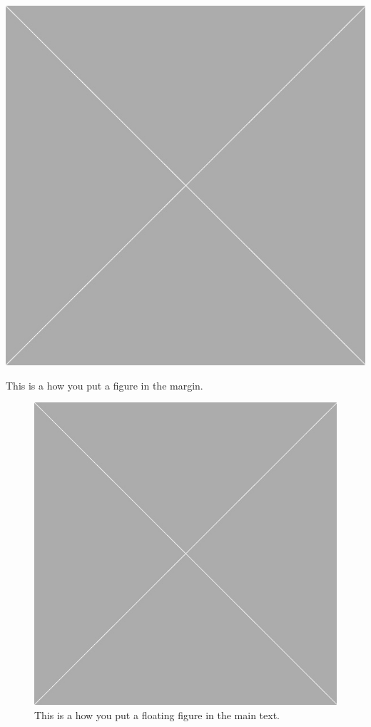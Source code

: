 \documentclass[10pt,oneside]{book}
\begin{document}
\begin{marginfigure}
  \includegraphics[width=\linewidth]{Pictures/placeholder.jpg}
  \caption{This is a how you put a figure in the margin.}
  \label{fig:marginfig}
\end{marginfigure}

\begin{figure}
  \centering
  \includegraphics[width=\linewidth]{Pictures/placeholder.jpg}
  \caption{This is a how you put a floating figure in the main text.}
  \label{fig:floatingfig}
\end{figure}
\end{document}
